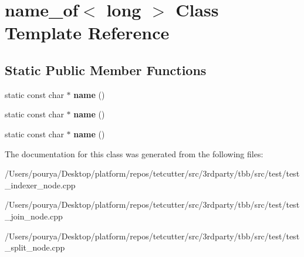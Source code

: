 \hypertarget{classname__of_3_01long_01_4}{}\section{name\+\_\+of$<$ long $>$ Class Template Reference}
\label{classname__of_3_01long_01_4}
\subsection*{Static Public Member Functions}
\begin{DoxyCompactItemize}
\item 
\hypertarget{classname__of_3_01long_01_4_a0127b61f0ac91aaef7a54d6eb445f175}{}static const char $\ast$ {\bfseries name} ()\label{classname__of_3_01long_01_4_a0127b61f0ac91aaef7a54d6eb445f175}

\item 
\hypertarget{classname__of_3_01long_01_4_a0127b61f0ac91aaef7a54d6eb445f175}{}static const char $\ast$ {\bfseries name} ()\label{classname__of_3_01long_01_4_a0127b61f0ac91aaef7a54d6eb445f175}

\item 
\hypertarget{classname__of_3_01long_01_4_a0127b61f0ac91aaef7a54d6eb445f175}{}static const char $\ast$ {\bfseries name} ()\label{classname__of_3_01long_01_4_a0127b61f0ac91aaef7a54d6eb445f175}

\end{DoxyCompactItemize}


The documentation for this class was generated from the following files\+:\begin{DoxyCompactItemize}
\item 
/\+Users/pourya/\+Desktop/platform/repos/tetcutter/src/3rdparty/tbb/src/test/test\+\_\+indexer\+\_\+node.\+cpp\item 
/\+Users/pourya/\+Desktop/platform/repos/tetcutter/src/3rdparty/tbb/src/test/test\+\_\+join\+\_\+node.\+cpp\item 
/\+Users/pourya/\+Desktop/platform/repos/tetcutter/src/3rdparty/tbb/src/test/test\+\_\+split\+\_\+node.\+cpp\end{DoxyCompactItemize}
